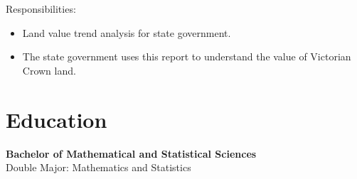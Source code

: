 \documentclass{article}
\begin{document}
Responsibilities:
\begin{itemize}
    \item Land value trend analysis for state government.
    \item The state government uses this report to understand the value of Victorian Crown land.
\end{itemize}

\section{Education}
\textbf{Bachelor of Mathematical and Statistical Sciences}
\\
Double Major: Mathematics and Statistics
\end{document}
